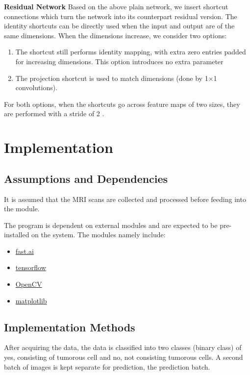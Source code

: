 \documentclass[10pt]{report}
\begin{document}
	\textbf{Residual Network}
	Based on the above plain network, we insert shortcut connections which turn
	the network into its counterpart residual version. The identity shortcuts
	can be directly used when the input and output are of the same dimensions.
	When the dimensions increase, we consider two options:
	\begin{enumerate}
		\item The shortcut still performs identity mapping, with extra zero
			entries padded for increasing dimensions. This option introduces no
			extra parameter
		\item The projection shortcut is used to match dimensions (done by 1×1
			convolutions).
	\end{enumerate}
	For both options, when the shortcuts go across feature maps of two sizes,
	they are performed with a stride of 2 \cite[4]{he2015deep} .

	\chapter{Implementation}

	\section{Assumptions and Dependencies}%
	It is assumed that the MRI scans are collected and processed before feeding
	into the module.

	The program is dependent on external modules and are expected to be
	pre-installed on the system. The modules namely include:

	\begin{itemize}
		\item \href{https://www.fast.ai/}{fast.ai}
		\item \href{https://www.tensorflow.org/}{tensorflow}
		\item \href{https://opencv.org/}{OpenCV}
		\item \href{https://matplotlib.org/}{matplotlib}
	\end{itemize}

	\section{Implementation Methods}%
	After acquiring the data, the data is classified into two classes (binary
	class) of yes, consisting of tumorous cell and no, not consisting tumorous
	cells. A second batch of images is kept separate for prediction, the
	prediction batch.
\end{document}
